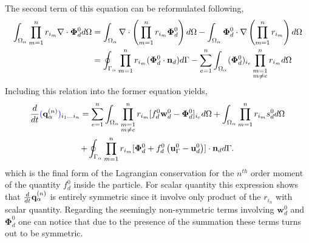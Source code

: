 \documentclass[11pt]{My_preprint}
\providecommand{\DIFadd}[1]{{\protect\color{blue}\uwave{#1}}} %
\providecommand{\DIFaddbegin}{} %
\providecommand{\DIFaddend}{} %
\providecommand{\DIFdelbegin}{} %
\providecommand{\DIFdelend}{} %
\begin{document}
The second term of this equation can be reformulated following,
\begin{align*}
    \int_{\Omega_{\alpha}}  \prod_{m=1}^{n} r_{i_m} \mathbf{\nabla}\cdot\bm\Phi_d^0  d\Omega
    &= \int_{\Omega_{\alpha}}  \mathbf{\nabla}\cdot \left(\prod_{m=1}^{n} r_{i_m} \bm\Phi_d^0 \right) d\Omega
    - \int_{\Omega_{\alpha}}  \bm\Phi_d^0 \cdot \mathbf{\nabla} \left(\prod_{m=1}^{n} r_{i_m} \right) d\Omega\\
    &= \oint_{\Gamma_{\alpha}}  \prod_{m=1}^{n} r_{i_m} (\bm\Phi_d^0 \cdot \textbf{n}_d) d\Gamma
    -\sum_{e=1}^{n} 
    \int_{\Omega_{\alpha}}  (\bm\Phi_d^0)_{i_e}  \prod^{n}_{\substack{ m=1 \\m \neq e}} r_{i_m}   d\Omega
\end{align*}
Including this relation into the former equation yields, 
\begin{multline}
    \ddt {\DIFdelbegin %
\DIFdelend \DIFaddbegin \DIFadd{(}\DIFaddend \textbf{q}_\alpha^{(n)}\DIFdelbegin %
\DIFdelend \DIFaddbegin \DIFadd{)}\DIFaddend _{i_1\ldots i_n}}
    = \sum_{e=1}^{n} 
    \intO{
        \prod^{n}_{\substack{ m=1 \\m \neq e}} r_{i_m} [f_d^0 \textbf{w}_d^0  - \bm\Phi_d^0]_{i_e}
    }
+ \intO{ \pri{1}{n} s_d^0 }\\
    +\intS{ \pri{1}{n} [\bm\Phi_d^0 + f_d^0 \left(\textbf{u}_\Gamma^0 - \textbf{u}_d^0\right)]\cdot \textbf{n}_d }.
    \label{eq:dt_q_n}
\end{multline}
which is the final form of the Lagrangian conservation for the $n^{th}$ order moment of the quantity $f_d^0$ inside the particle. 
For scalar quantity this expression shows that $\frac{d}{dt} \textbf{q}_\alpha^{(n)}$ is entirely symmetric since it involve only product of the $r_{i_n}$ with scalar quantity. 
Regarding the seemingly non-symmetric terms involving $\textbf{w}_d^0$ and $\bm\Phi_d^0$ one can notice that due to the presence of the summation these terms turns out to be symmetric. 
\end{document}
